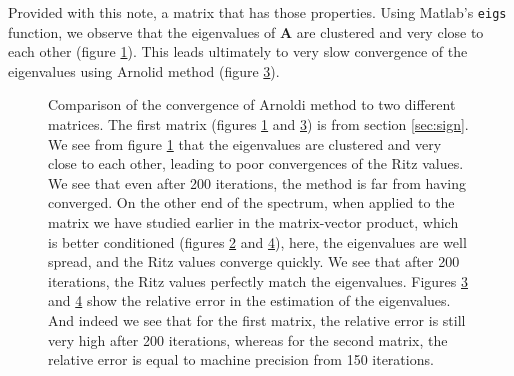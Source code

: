 \documentclass[11pt]{article}
\numberwithin{equation}{section}
\begin{document}
Provided with this note, a matrix that has those properties. Using Matlab's \texttt{eigs} function, we observe that the eigenvalues of $\mathbf{A}$ are clustered and very close to each other (figure \ref{fig:ritz_poor_cond}). This leads ultimately to very slow convergence of the eigenvalues using Arnolid method (figure \ref{fig:sign_difficult_est}). 
\begin{figure}
    \centering
    \begin{subfigure}[b]{.45\linewidth}
        
        \caption{}
        \label{fig:ritz_poor_cond}
    \end{subfigure}\hspace{0.05\linewidth}
    \begin{subfigure}[b]{.45\linewidth}
        
        \caption{}
        \label{fig:ritz_good_cond}
    \end{subfigure}
    \begin{subfigure}[b]{.45\linewidth}
        
        \caption{}
        \label{fig:sign_difficult_est}
    \end{subfigure}\hspace{0.05\linewidth}
    \begin{subfigure}[b]{.45\linewidth}
        
        \caption{}
        \label{fig:sign_easy_est}
    \end{subfigure}
    \caption{Comparison of the convergence of Arnoldi method to two different matrices. The first matrix (figures \ref{fig:ritz_poor_cond} and \ref{fig:sign_difficult_est}) is from section \ref{sec:sign}. We see from figure \ref{fig:ritz_poor_cond} that the eigenvalues are clustered and very close to each other, leading to poor convergences of the Ritz values. We see that even after 200 iterations, the method is far from having converged. On the other end of the spectrum, when applied to the matrix we have studied earlier in the matrix-vector product, which is better conditioned (figures \ref{fig:ritz_good_cond} and \ref{fig:sign_easy_est}), here, the eigenvalues are well spread, and the Ritz values converge quickly. We see that after 200 iterations, the Ritz values perfectly match the eigenvalues. Figures \ref{fig:sign_difficult_est} and \ref{fig:sign_easy_est} show the relative error in the estimation of the eigenvalues. And indeed we see that for the first matrix, the relative error is still very high after 200 iterations, whereas for the second matrix, the relative error is equal to machine precision from 150 iterations.}
    \label{fig:fullritz}
\end{figure}
\end{document}
